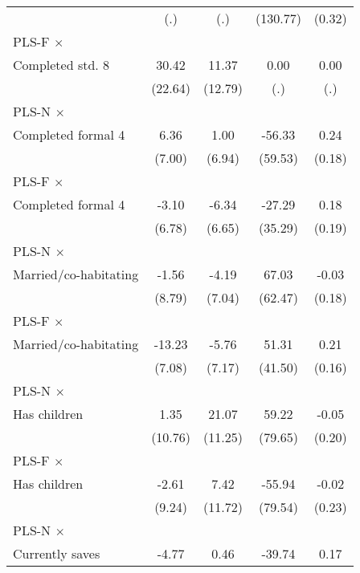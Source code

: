 \begin{table}[htbp]
\begin{tabular}{l*{4}{c}}
                &      (.)         &      (.)         & (130.77)         &   (0.32)         \\
\addlinespace
PLS-F $\times$ \\ Completed std. 8&    30.42         &    11.37         &     0.00         &     0.00         \\
                &  (22.64)         &  (12.79)         &      (.)         &      (.)         \\
\addlinespace
PLS-N $\times$ \\ Completed formal 4&     6.36         &     1.00         &   -56.33         &     0.24         \\
                &   (7.00)         &   (6.94)         &  (59.53)         &   (0.18)         \\
\addlinespace
PLS-F $\times$ \\ Completed formal 4&    -3.10         &    -6.34         &   -27.29         &     0.18         \\
                &   (6.78)         &   (6.65)         &  (35.29)         &   (0.19)         \\
\addlinespace
PLS-N $\times$ \\ Married/co-habitating&    -1.56         &    -4.19         &    67.03         &    -0.03         \\
                &   (8.79)         &   (7.04)         &  (62.47)         &   (0.18)         \\
\addlinespace
PLS-F $\times$ \\ Married/co-habitating&   -13.23\sym{*}  &    -5.76         &    51.31         &     0.21         \\
                &   (7.08)         &   (7.17)         &  (41.50)         &   (0.16)         \\
\addlinespace
PLS-N $\times$ \\ Has children&     1.35         &    21.07\sym{*}  &    59.22         &    -0.05         \\
                &  (10.76)         &  (11.25)         &  (79.65)         &   (0.20)         \\
\addlinespace
PLS-F $\times$ \\ Has children&    -2.61         &     7.42         &   -55.94         &    -0.02         \\
                &   (9.24)         &  (11.72)         &  (79.54)         &   (0.23)         \\
\addlinespace
PLS-N $\times$ \\ Currently saves&    -4.77         &     0.46         &   -39.74         &     0.17         \\

\end{tabular}
\end{table}
